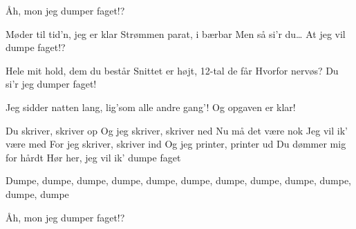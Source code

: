 \documentclass[a4paper,11pt]{article}
\begin{document}
\begin{song}
 Åh, mon jeg dumper faget!? 

Møder til tid’n, jeg er klar 
Strømmen parat, i bærbar 
Men så si’r du… At jeg vil dumpe faget!? 

Hele mit hold, dem du består 
Snittet er højt, 12-tal de får 
Hvorfor nervøs? 
Du si’r jeg dumper faget! 

Jeg sidder natten lang, lig’som alle andre gang’! 
Og opgaven er klar!


 Du skriver, skriver op 
Og jeg skriver, skriver ned 
Nu må det være nok 
Jeg vil ik’ være med 
For jeg skriver, skriver ind 
Og jeg printer, printer ud 
Du dømmer mig for hårdt 
Hør her, jeg vil ik’ dumpe faget

 Dumpe, dumpe, dumpe, dumpe, dumpe, dumpe, dumpe, dumpe, dumpe, dumpe, dumpe, dumpe 

 Åh, mon jeg dumper faget!? 


\end{song}
\end{document}
